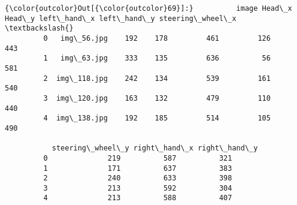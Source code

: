 \documentclass[11pt]{article}
\begin{document}
\begin{Verbatim}[commandchars=\\\{\}]
{\color{outcolor}Out[{\color{outcolor}69}]:}          image Head\_x Head\_y left\_hand\_x left\_hand\_y steering\_wheel\_x  \textbackslash{}
         0   img\_56.jpg    192    178         461         126              443   
         1   img\_63.jpg    333    135         636          56              581   
         2  img\_118.jpg    242    134         539         161              540   
         3  img\_120.jpg    163    132         479         110              440   
         4  img\_138.jpg    192    185         514         105              490   
         
           steering\_wheel\_y right\_hand\_x right\_hand\_y  
         0              219          587          321  
         1              171          637          383  
         2              240          633          398  
         3              213          592          304  
         4              213          588          407  
\end{Verbatim}
            
\end{document}

